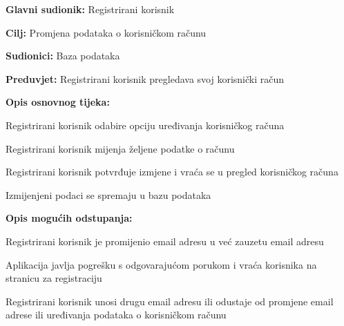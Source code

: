 				
				\noindent {}
				\begin{packed_item}
					
					\item \textbf{Glavni sudionik:} Registrirani korisnik
					\item  \textbf{Cilj:} Promjena podataka o korisničkom računu
					\item  \textbf{Sudionici:} Baza podataka
					\item  \textbf{Preduvjet:} Registrirani korisnik pregledava svoj korisnički račun
					
					\item  \textbf{Opis osnovnog tijeka:}
					\item[] \begin{packed_enum}
						\item Registrirani korisnik odabire opciju uređivanja korisničkog računa
						\item Registrirani korisnik mijenja željene podatke o računu
						\item Registrirani korisnik potvrđuje izmjene i vraća se u pregled korisničkog računa
						\item Izmijenjeni podaci se spremaju u bazu podataka
					\end{packed_enum}
					
					\item  \textbf{Opis mogućih odstupanja:}
					\item[] \begin{packed_item}
						\item[4.a] Registrirani korisnik je promijenio email adresu u već zauzetu email adresu
						\item[] \begin{packed_enum}
							\item Aplikacija javlja pogrešku s odgovarajućom porukom i vraća korisnika na stranicu za registraciju
							\item Registrirani korisnik unosi drugu email adresu ili odustaje od promjene email adrese ili uređivanja podataka o korisničkom računu
						\end{packed_enum}
					\end{packed_item}
				\end{packed_item}
				
